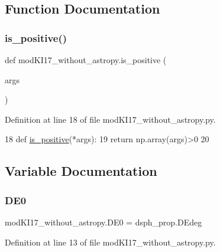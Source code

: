\subsection{Function Documentation}
\mbox{\label{namespacemodKI17__without__astropy_a80eeeb18d69cff2fde94fdb26c7c0089}} 
\subsubsection{\texorpdfstring{is\+\_\+positive()}{is\_positive()}}
{\footnotesize\ttfamily def mod\+K\+I17\+\_\+without\+\_\+astropy.\+is\+\_\+positive (\begin{DoxyParamCaption}\item[{}]{args }\end{DoxyParamCaption})}



Definition at line 18 of file mod\+K\+I17\+\_\+without\+\_\+astropy.\+py.


\begin{DoxyCode}
18 \textcolor{keyword}{def }\hyperlink{namespacemodKI17__without__astropy_a80eeeb18d69cff2fde94fdb26c7c0089}{is\_positive}(*args):
19     \textcolor{keywordflow}{return} np.array(args)>0
20 
\end{DoxyCode}


\subsection{Variable Documentation}
\mbox{\label{namespacemodKI17__without__astropy_a20c59be5b70f1194d0996e8582c47eba}} 
\subsubsection{\texorpdfstring{D\+E0}{DE0}}
{\footnotesize\ttfamily mod\+K\+I17\+\_\+without\+\_\+astropy.\+D\+E0 = dsph\+\_\+prop.\+D\+Edeg}



Definition at line 13 of file mod\+K\+I17\+\_\+without\+\_\+astropy.\+py.

